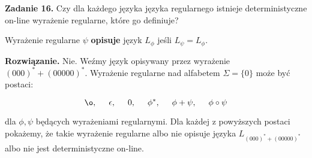 \documentclass[a4paper]{article}
\begin{document}
\setlength{\parindent}{0pt}

\textbf{Zadanie 16.} Czy dla każdego języka języka regularnego istnieje deterministyczne on-line wyrażenie regularne, które go definiuje?
\vspace{1cm}

Wyrażenie regularne $\psi$ \textbf{opisuje} język $L_{\phi}$ jeśli $L_{\psi} = L_{\phi}$.
\vspace{1cm}

\textbf{Rozwiązanie.} Nie. Weźmy język opisywany przez wyrażenie $(000)^* + (00000)^*$. Wyrażenie regularne nad alfabetem $\Sigma = \{ 0 \}$ może być postaci:

$$ \o,\hspace{5mm} \epsilon,\hspace{5mm} 0,\hspace{5mm} \phi^*,\hspace{5mm} \phi + \psi,\hspace{5mm} \phi \circ \psi$$

dla $\phi, \psi$ będących wyrażeniami regularnymi. Dla każdej z powyższych postaci pokażemy, że takie wyrażenie regularne albo nie opisuje języka $L_{(000)^* + (00000)^*}$ albo nie jest deterministyczne on-line.
\end{document}

